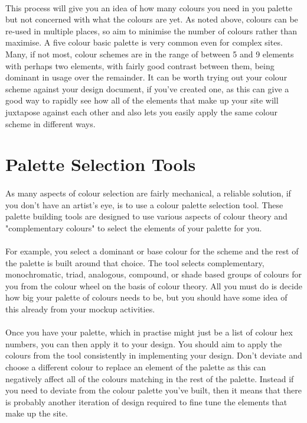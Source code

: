\paragraph{} This process will give you an idea of how many colours you need in you palette but not concerned with what the colours are yet. As noted above, colours can be re-used in multiple places, so aim to minimise the number of colours rather than maximise. A five colour basic palette is very common even for complex sites. Many, if not most, colour schemes are in the range of between 5 and 9 elements with perhaps two elements, with fairly good contrast between them, being dominant in usage over the remainder. It can be worth trying out your colour scheme against your design document, if you've created one, as this can give a good way to rapidly see how all of the elements that make up your site will juxtapose against each other and also lets you easily apply the same colour scheme in different ways.


\section{Palette Selection Tools}
\paragraph{} As many aspects of colour selection are fairly mechanical, a reliable solution, if you don't have an artist's eye, is to use a colour palette selection tool. These palette building tools are designed to use various aspects of colour theory and "complementary colours" to select the elements of your palette for you.

\paragraph{} For example, you select a dominant or base colour for the scheme and the rest of the palette is built around that choice. The tool selects complementary, monochromatic, triad, analogous, compound, or shade based groups of colours for you from the colour wheel on the basis of colour theory. All you must do is decide how big your palette of colours needs to be, but you should have some idea of this already from your mockup activities.

\paragraph{} Once you have your palette, which in practise might just be a list of colour hex numbers, you can then apply it to your design. You should aim to apply the colours from the tool consistently in implementing your design. Don’t deviate and choose a different colour to replace an element of the palette as this can negatively affect all of the colours matching in the rest of the palette. Instead if you need to deviate from the colour palette you've built, then it means that there is probably another iteration of design required to fine tune the elements that make up the site.

